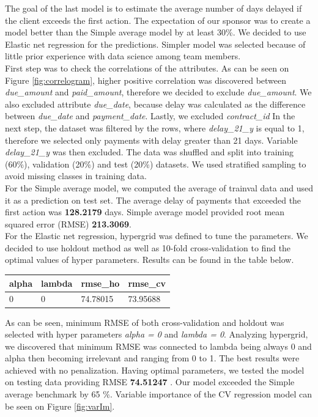 \documentclass[
]{article}
\begin{document}
The goal of the last model is to estimate the average number of days delayed if the client exceeds the first action.
The expectation of our sponsor was to create a model better than the Simple average model by at least 30\%. We decided to use Elastic net regression for the predictions. Simpler model was
selected because of little prior experience with data science among team members.\\
First step was to check the correlations of the attributes. As can be seen on Figure \ref{fig:correlogram}, higher positive correlation was discovered between \emph{due\_amount} and \emph{paid\_amount}, therefore we decided to exclude \emph{due\_amount}. We also excluded attribute \emph{due\_date}, because delay was calculated as the difference between \emph{due\_date} and \emph{payment\_date}. Lastly, we excluded \emph{contract\_id}
In the next step, the dataset was filtered by the rows, where \emph{delay\_21\_y} is equal to 1, therefore we selected only payments with delay greater than 21 days. Variable \emph{delay\_21\_y} was then excluded. The data was shuffled and split into training (60\%), validation (20\%) and test (20\%) datasets. We used stratified sampling to avoid missing classes in training data.\\
For the Simple average model, we computed the average of trainval data and used it as a prediction on test set. The average delay of payments that exceeded the first action was \textbf{128.2179} days. Simple average model provided root mean squared error (RMSE) \textbf{213.3069}.\\
For the Elastic net regression, hypergrid was defined to tune the parameters. We decided to use holdout method as well as 10-fold cross-validation to find the optimal values of hyper parameters. Results can be found in the table below.

\begin{longtable}[]{@{}llll@{}}
\toprule
alpha & lambda & rmse\_ho & rmse\_cv\tabularnewline
\midrule
\endhead
0 & 0 & 74.78015 & 73.95688\tabularnewline
\bottomrule
\end{longtable}

As can be seen, minimum RMSE of both cross-validation and holdout was selected with hyper parameters \emph{alpha = 0} and \emph{lambda = 0}. Analyzing hypergrid, we discovered that minimum RMSE was connected to lambda being always 0 and alpha then becoming irrelevant and ranging from 0 to 1. The best results were achieved with no penalization.
Having optimal parameters, we tested the model on testing data providing RMSE \textbf{74.51247 }. Our model exceeded the Simple average benchmark by 65 \%. Variable importance of the CV regression model can be seen on Figure \ref{fig:varIm}.
\end{document}
